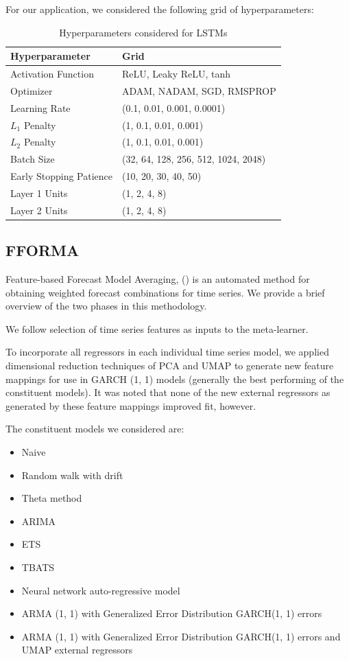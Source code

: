 \documentclass{article}
\begin{document}
For our application, we considered the following grid of hyperparameters:
\begin{table}[!htb]
	\begin{tabular}{|ll|}
		\hline
		Hyperparameter & Grid \\ \hline
		Activation Function & ReLU, Leaky ReLU, tanh \\
		Optimizer & ADAM, NADAM, SGD, RMSPROP \\
		Learning Rate & (0.1, 0.01, 0.001, 0.0001) \\
		$L_1$ Penalty & (1, 0.1, 0.01, 0.001) \\
		$L_2$ Penalty & (1, 0.1, 0.01, 0.001) \\
		Batch Size & (32, 64, 128, 256, 512, 1024, 2048) \\
		Early Stopping Patience & (10, 20, 30, 40, 50) \\ 
		Layer 1 Units & (1, 2, 4, 8) \\
		Layer 2 Units & (1, 2, 4, 8) \\ \hline
	\end{tabular}
	\caption{Hyperparameters considered for LSTMs}
\end{table}

\FloatBarrier
\subsection{FFORMA}
Feature-based Forecast Model Averaging, (\cite{montero-manso_fforma_2020}) is an automated method for obtaining weighted forecast combinations for time series. We provide a brief overview of the two phases in this methodology.

We follow \cite{montero-manso_fforma_2020} selection of time series features as inputs to the meta-learner. 

To incorporate all regressors in each individual time series model, we applied dimensional reduction techniques of PCA and UMAP to generate new feature mappings for use in GARCH (1, 1) models (generally the best performing of the constituent models). It was noted that none of the new external regressors as generated by these feature mappings improved fit, however.

The constituent models we considered are:
\begin{itemize}
	\item Naive
	\item Random walk with drift
	\item Theta method
	\item ARIMA
	\item ETS
	\item TBATS
	\item Neural network auto-regressive model
	\item ARMA (1, 1) with Generalized Error Distribution GARCH(1, 1) errors
	\item ARMA (1, 1) with Generalized Error Distribution GARCH(1, 1) errors and UMAP external regressors
\end{itemize}
\end{document}
